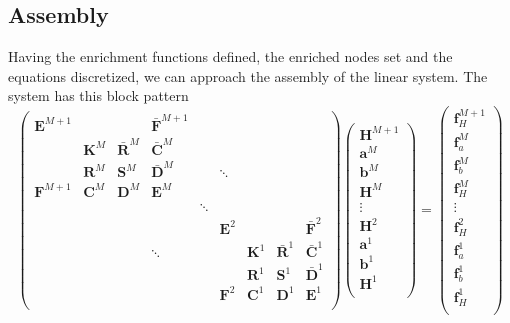 \documentclass[preprint,12pt,authoryear]{elsarticle}
\begin{document}
\subsection{Assembly}
Having the enrichment functions defined, the enriched nodes set and the equations discretized, we can approach
the assembly of the linear system. The system has this block pattern 
\begin{equation}
  \begin{pmatrix}
  \mathbf{E}^{M+1} &               &                     & \bar{\mathbf{F}}^{M+1}   & &&&&\\
                   & \mathbf{K}^M  & \bar{\mathbf{R}}^M  & \bar{\mathbf{C}}^M       & &&&&\\
                   & \mathbf{R}^M  & \mathbf{S}^M        & \bar{\mathbf{D}}^M       & &\ddots&&&\\
  \mathbf{F}^{M+1} & \mathbf{C}^M  & \mathbf{D}^M        & \mathbf{E}^M             & &&&&\\
  &&&& \ddots &&&& \\
  &&&& & \mathbf{E}^2 &              &                    & \bar{\mathbf{F}}^2 \\
  &&&\ddots& &              & \mathbf{K}^1 & \bar{\mathbf{R}}^1 & \bar{\mathbf{C}}^1 \\
  &&&& &              & \mathbf{R}^1 & \mathbf{S}^1       & \bar{\mathbf{D}}^1 \\
  &&&& & \mathbf{F}^2 & \mathbf{C}^1 & \mathbf{D}^1       & \mathbf{E}^1 \\
  \end{pmatrix}
  \begin{pmatrix}
    \mathbf{H}^{M+1} \\
    \mathbf{a}^{M} \\
    \mathbf{b}^{M} \\
    \mathbf{H}^{M} \\
    \mathbf{\vdots} \\
    \mathbf{H}^{2} \\
    \mathbf{a}^{1} \\
    \mathbf{b}^{1} \\
    \mathbf{H}^{1} \\
  \end{pmatrix} =
  \begin{pmatrix}
    \mathbf{f}^{M+1}_H \\
    \mathbf{f}^{M}_a \\
    \mathbf{f}^{M}_b \\
    \mathbf{f}^{M}_H \\
    \mathbf{\vdots} \\
    \mathbf{f}^{2}_H \\
    \mathbf{f}^{1}_a \\
    \mathbf{f}^{1}_b \\
    \mathbf{f}^{1}_H \\
  \end{pmatrix}
\end{equation}
\end{document}
